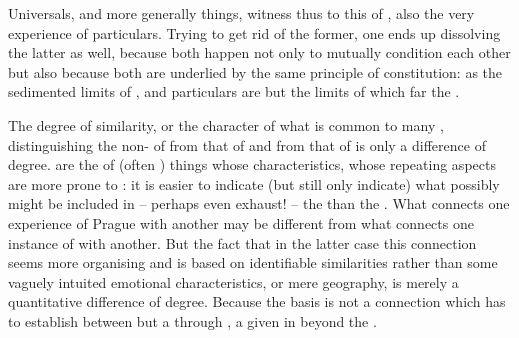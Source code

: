 Universals, and more generally  things, witness thus to this
 of ,  also the very experience of
particulars. Trying to get rid of the former, one ends up dissolving the latter
as well, because both happen not only to mutually condition each other but also
because both are underlied by the same principle of constitution: as the
sedimented limits of , and particulars are but the 
limits of  which  far  the \hoa. 




The degree of similarity, or the character of what is common to many , distinguishing the non- of  from that of
 and from that of  is only a difference of degree.
 are the  of (often ) things whose
characteristics, whose repeating aspects are more prone to :
it is easier to indicate (but still only indicate) what possibly might be
included in -- perhaps even exhaust! -- the   than the
 .  What connects one experience of Prague with another
may be different from what connects one instance of  with another.
But the fact that in the latter case this connection seems more organising and
is based on  identifiable similarities rather than some vaguely
intuited emotional 
characteristics, or mere geography, is merely a quantitative difference of
degree. Because the basis is not a connection which  has to
establish between  but a  through
  , a  given in  beyond the \hoa.

